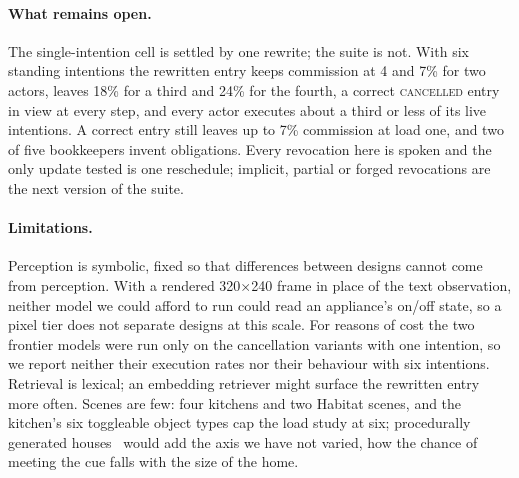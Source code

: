 \paragraph{What remains open.}
The single-intention cell is settled by one rewrite; the suite is not. With
six standing intentions the rewritten entry keeps commission at 4 and 7\%
for two actors, leaves 18\% for a third and 24\% for the fourth, a correct
\textsc{cancelled} entry in view at every step, and every actor executes
about a third or less of its live intentions. A correct entry still
leaves up to 7\% commission at load one, and two of five bookkeepers
invent obligations. Every revocation here is spoken and the only update tested is
one reschedule; implicit, partial or forged revocations are the next
version of the suite.

\paragraph{Limitations.}
Perception is symbolic, fixed so that differences between designs cannot
come from perception. With a rendered 320$\times$240 frame in place of the text observation,
neither model we could afford to run could read an appliance's on/off
state, so a pixel tier does not separate designs at this scale. For reasons of cost the two frontier models were run only on the
cancellation variants with one intention, so we report neither their
execution rates nor their behaviour with six intentions. Retrieval is lexical; an embedding retriever might surface
the rewritten entry more often. Scenes are few: four kitchens and two Habitat
scenes, and the kitchen's six toggleable object types cap the load study
at six; procedurally generated houses~\cite{deitke2022procthor} would add
the axis we have not varied, how the chance of meeting the cue falls with
the size of the home.
